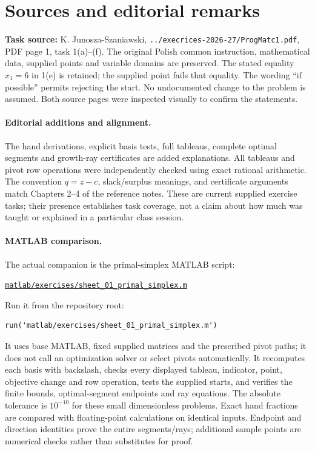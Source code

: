 \documentclass[11pt,a4paper]{article}
\begin{document}
\section{Sources and editorial remarks}\label{sec:sources}
\noindent\textbf{Task source:} K. Junosza-Szaniawski,
\texttt{../execrices-2026-27/ProgMatc1.pdf}, PDF page 1, task 1(a)--(f).
The original Polish common instruction, mathematical data, supplied points and
variable domains are preserved. The stated equality $x_1=6$ in 1(e) is retained;
the supplied point fails that equality. The wording ``if possible'' permits
rejecting the start. No undocumented change to the problem is assumed.
Both source pages were inspected visually to confirm the statements.

\paragraph{Editorial additions and alignment.}
The hand derivations, explicit basis tests, full tableaus, complete optimal
segments and growth-ray certificates are added explanations. All tableaus and
pivot row operations were independently checked using exact rational arithmetic.
The convention $q=z-c$, slack/surplus meanings, and certificate arguments match
Chapters 2--4 of the reference notes. These are current supplied exercise tasks;
their presence establishes task coverage, not a claim about how much was taught
or explained in a particular class session.

\paragraph{MATLAB comparison.}
The actual companion is the primal-simplex MATLAB script:
\begin{center}
  \href{run:matlab/exercises/sheet_01_primal_simplex.m}{\texttt{matlab/exercises/sheet\_01\_primal\_simplex.m}}
\end{center}
Run it from the repository root:
\begin{lstlisting}
run('matlab/exercises/sheet_01_primal_simplex.m')
\end{lstlisting}
It uses base MATLAB, fixed supplied matrices and the prescribed pivot paths;
it does not call an optimization solver or select pivots automatically.
It recomputes each basis with backslash, checks every displayed tableau,
indicator, point, objective change and row operation, tests the supplied starts,
and verifies the finite bounds, optimal-segment endpoints and ray equations.
The absolute tolerance is $10^{-10}$ for these small dimensionless problems.
Exact hand fractions are compared with floating-point calculations on identical
inputs. Endpoint and direction identities prove the entire segments/rays;
additional sample points are numerical checks rather than substitutes for proof.
\end{document}
